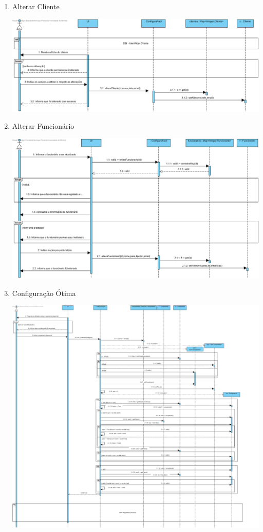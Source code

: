 \documentclass[11pt]{article} %
\begin{document}
\begin{enumerate}
\begin{center}
		\end{center}\newpage
	\item Alterar Cliente
		\begin{center}
 			\includegraphics[width = 6in]{dsi_alterar_cliente.png}
		\end{center}
	\item Alterar Funcionário
		\begin{center}
 			\includegraphics[width = 6in]{dsi_alterar_funcionario.png}
		\end{center}\newpage
	\item Configuração Ótima
		\begin{center}
 			\includegraphics[width = 6in]{dsi_configuracao_otima.png}

\end{center}
\end{enumerate}
\end{document}
